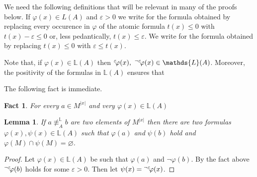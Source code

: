 \documentclass[12pt,letterpaper,oneside,reqno]{amsart}
\theoremstyle{plain}
\newtheorem{lemma}[theorem]{Lemma}
\newtheorem{fact}[theorem]{Fact}
\theoremstyle{remark}
\renewcommand*{\emph}[1]{%
   \smash{\tikz[baseline]\node[rectangle, fill=olive!25, rounded corners, inner xsep=0.5ex, inner ysep=0.2ex, anchor=base, minimum height = 2.7ex]{#1};}}
\begin{document}
We need the following definitions that will be relevant in many of the proofs below.
If $\varphi(x)\in L(A)$ and $\varepsilon>0$ we write \emph{${}^{\varepsilon\kern-2pt}\varphi(x)$\/} for the formula obtained by replacing every occurence in $\varphi$ of the atomic formula $t(x)\le0$ with $t(x)-\varepsilon\le0$ or, less pedantically, $t(x)\le\varepsilon$.
We write \emph{${}^{\neg\varepsilon\kern-2pt}\varphi(x)$\/} for the formula obtained by replacing $t(x)\le0$ with $\varepsilon\le t(x)$.

Note that, if $\varphi(x)\in\mathds{L}(A)$ then ${}^{\varepsilon\kern-2pt}\varphi(x),\ {}^{\neg\varepsilon\kern-2pt}\varphi(x)\in\mathds{L}(A)$.
Moreover, the positivity of the formulas in $\mathds{L}(A)$ ensures that



The following fact is immediate.

\begin{fact}\label{fact_immediate}
  For every $a\in M^{|x|}$ and very $\varphi(x)\in\mathds{L}(A)$
  
  
  \hfill\qedsymbol
\end{fact}

\begin{lemma}
  If $a\nequiv_A^\mathds{L}b$ are two elements of $M^{|x|}$ then there are two formulas $\varphi(x), \psi(x)\in\mathds{L}(A)$ such that $\varphi(a)$ and $\psi(b)$ hold and $\varphi(M)\cap\psi(M)=\varnothing$.
\end{lemma}

\begin{proof}
  Let $\varphi(x)\in\mathds{L}(A)$ be such that $\varphi(a)$ and $\neg\varphi(b)$.
  By the fact above ${}^{\neg\varepsilon\kern-2pt}\varphi(b)$ holds for some $\varepsilon>0$.
  Then let $\psi(x)={}^{\neg\varepsilon\kern-2pt}\varphi(x)$.
\end{proof}
\end{document}

